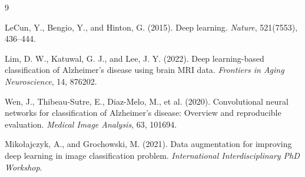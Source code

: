 \documentclass[12pt]{article}
\begin{document}
\begin{thebibliography}{9}


LeCun, Y., Bengio, Y., and Hinton, G. (2015).
Deep learning.
\textit{Nature}, 521(7553), 436–444.

Lim, D. W., Katuwal, G. J., and Lee, J. Y. (2022).
Deep learning-based classification of Alzheimer’s disease using brain MRI data.
\textit{Frontiers in Aging Neuroscience}, 14, 876202.

Wen, J., Thibeau-Sutre, E., Diaz-Melo, M., et al. (2020).
Convolutional neural networks for classification of Alzheimer’s disease: Overview and reproducible evaluation.
\textit{Medical Image Analysis}, 63, 101694.

Mikołajczyk, A., and Grochowski, M. (2021).
Data augmentation for improving deep learning in image classification problem.
\textit{International Interdisciplinary PhD Workshop}.

\end{thebibliography}
\end{document}
